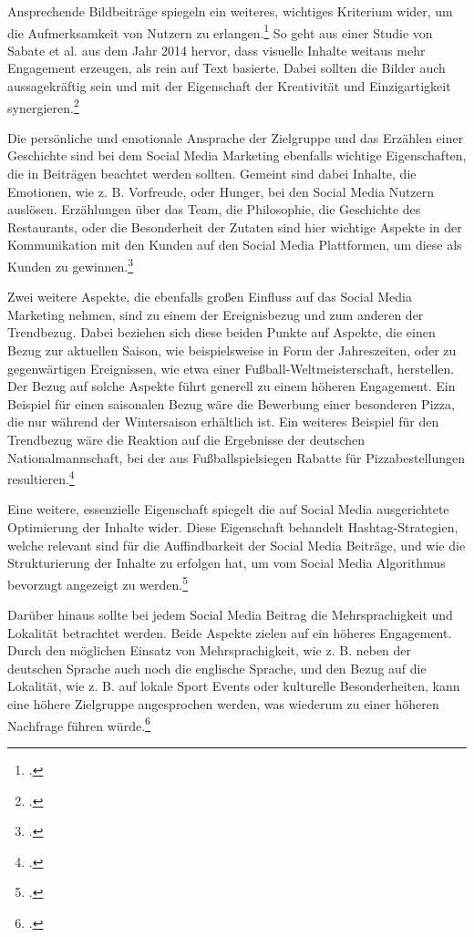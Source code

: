 Ansprechende Bildbeiträge spiegeln ein weiteres, wichtiges Kriterium wider, um die Aufmerksamkeit von Nutzern zu erlangen.\footcite{davidson_social_media}
So geht aus einer Studie von Sabate et al. aus dem Jahr 2014 hervor, dass visuelle Inhalte weitaus mehr Engagement erzeugen, als rein auf Text basierte.
Dabei sollten die Bilder auch aussagekräftig sein und mit der Eigenschaft der Kreativität und Einzigartigkeit synergieren.\footcite{sabate_factors}

Die persönliche und emotionale Ansprache der Zielgruppe und das Erzählen einer Geschichte sind bei dem Social Media Marketing ebenfalls wichtige Eigenschaften, die in Beiträgen beachtet werden sollten.
Gemeint sind dabei Inhalte, die Emotionen, wie z. B. Vorfreude, oder Hunger, bei den Social Media Nutzern auslösen.
Erzählungen über das Team, die Philosophie, die Geschichte des Restaurants, oder die Besonderheit der Zutaten sind hier wichtige Aspekte in der Kommunikation mit den Kunden auf den Social Media Plattformen, um diese als Kunden zu gewinnen.\footcite{book}

Zwei weitere Aspekte, die ebenfalls großen Einfluss auf das Social Media Marketing nehmen, sind zu einem der Ereignisbezug und zum anderen der Trendbezug.
Dabei beziehen sich diese beiden Punkte auf Aspekte, die einen Bezug zur aktuellen Saison, wie beispielsweise in Form der Jahreszeiten, oder zu gegenwärtigen Ereignissen, wie etwa einer Fußball-Weltmeisterschaft, herstellen.
Der Bezug auf solche Aspekte führt generell zu einem höheren Engagement.
Ein Beispiel für einen saisonalen Bezug wäre die Bewerbung einer besonderen Pizza, die nur während der Wintersaison erhältlich ist.
Ein weiteres Beispiel für den Trendbezug wäre die Reaktion auf die Ergebnisse der deutschen Nationalmannschaft, bei der aus Fußballspielsiegen Rabatte für Pizzabestellungen resultieren.\footcite{inbook}

Eine weitere, essenzielle Eigenschaft spiegelt die auf Social Media ausgerichtete Optimierung der Inhalte wider.
Diese Eigenschaft behandelt Hashtag-Strategien, welche relevant sind für die Auffindbarkeit der Social Media Beiträge, und wie die Strukturierung der Inhalte zu erfolgen hat, um vom Social Media Algorithmus bevorzugt angezeigt zu werden.\footcite{social_media_marketing}

Darüber hinaus sollte bei jedem Social Media Beitrag die Mehrsprachigkeit und Lokalität betrachtet werden.
Beide Aspekte zielen auf ein höheres Engagement.
Durch den möglichen Einsatz von Mehrsprachigkeit, wie z. B. neben der deutschen Sprache auch noch die englische Sprache, und den Bezug auf die Lokalität, wie z. B. auf lokale Sport Events oder kulturelle Besonderheiten, kann eine höhere Zielgruppe angesprochen werden, was wiederum zu einer höheren Nachfrage führen würde.\footcite{global_marketing_advertising}

